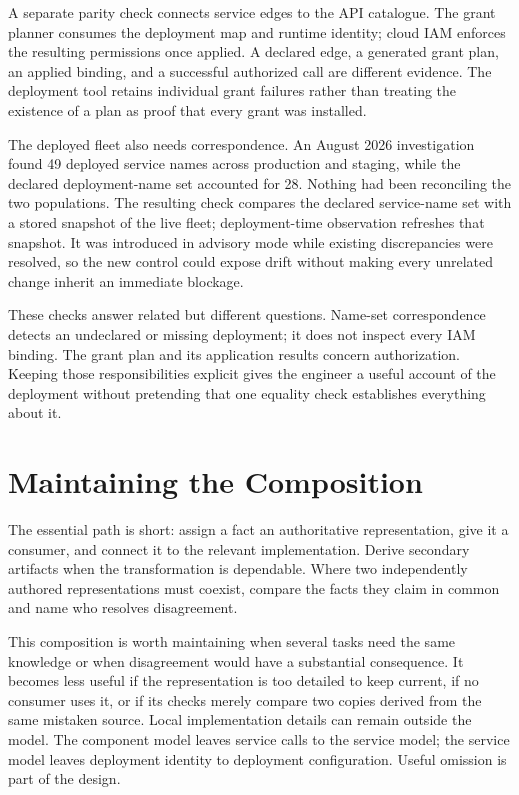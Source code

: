 A separate parity check connects service edges to the API catalogue. The grant planner consumes the deployment map and runtime identity; cloud IAM enforces the resulting permissions once applied. A declared edge, a generated grant plan, an applied binding, and a successful authorized call are different evidence. The deployment tool retains individual grant failures rather than treating the existence of a plan as proof that every grant was installed.

The deployed fleet also needs correspondence. An August 2026 investigation found 49 deployed service names across production and staging, while the declared deployment-name set accounted for 28. Nothing had been reconciling the two populations. The resulting check compares the declared service-name set with a stored snapshot of the live fleet; deployment-time observation refreshes that snapshot. It was introduced in advisory mode while existing discrepancies were resolved, so the new control could expose drift without making every unrelated change inherit an immediate blockage.

These checks answer related but different questions. Name-set correspondence detects an undeclared or missing deployment; it does not inspect every IAM binding. The grant plan and its application results concern authorization. Keeping those responsibilities explicit gives the engineer a useful account of the deployment without pretending that one equality check establishes everything about it.

\section{Maintaining the Composition}\label{heading:handbook-maintaining-coherence}

The essential path is short: assign a fact an authoritative representation, give it a consumer, and connect it to the relevant implementation. Derive secondary artifacts when the transformation is dependable. Where two independently authored representations must coexist, compare the facts they claim in common and name who resolves disagreement.

This composition is worth maintaining when several tasks need the same knowledge or when disagreement would have a substantial consequence. It becomes less useful if the representation is too detailed to keep current, if no consumer uses it, or if its checks merely compare two copies derived from the same mistaken source. Local implementation details can remain outside the model. The component model leaves service calls to the service model; the service model leaves deployment identity to deployment configuration. Useful omission is part of the design.

